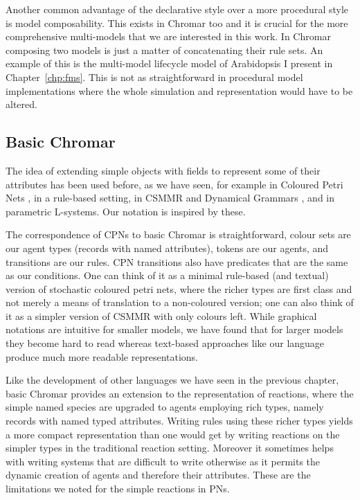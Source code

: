 Another common advantage of the declarative style over a more procedural style
is model composability. This exists in Chromar too and it is crucial for the
more comprehensive multi-models that we are interested in this work. In
Chromar composing two models is just a matter of concatenating their rule
sets. An example of this is the multi-model lifecycle model of Arabidopsis I
present in Chapter~\ref{chp:fms}. This is not as straightforward in procedural
model implementations where the whole simulation and representation would have
to be altered.


\subsection{Basic Chromar}
The idea of extending simple objects with fields to represent some of their
attributes has been used before, as we have seen, for example in Coloured Petri
Nets \citep{jensen_coloured_1987}, in a rule-based setting, in CSMMR
\citep{oury_coloured_2011} and Dynamical Grammars \citep{mjolsness2006stochastic},
and in parametric L-systems. Our notation is inspired by these.

The correspondence of CPNs to basic Chromar is straightforward, colour sets are
our agent types (records with named attributes), tokens are our agents, and
transitions are our rules. CPN transitions also have predicates that are the
same as our conditions. One can think of it as a minimal rule-based (and
textual) version of stochastic coloured petri nets, where the richer types are
first class and not merely a means of translation to a non-coloured version; one
can also think of it as a simpler version of CSMMR with only colours left. While
graphical notations are intuitive for smaller models, we have found that for
larger models they become hard to read whereas text-based approaches like our
language produce much more readable representations.

Like the development of other languages we have seen in the previous chapter,
basic Chromar provides an extension to the representation of reactions, where
the simple named species are upgraded to agents employing rich types, namely
records with named typed attributes. Writing rules using these richer types
yields a more compact representation than one would get by writing reactions on
the simpler types in the traditional reaction setting. Moreover it sometimes
helps with writing systems that are difficult to write otherwise as it permits
the dynamic creation of agents and therefore their attributes. These are the
limitations we noted for the simple reactions in PNs.

